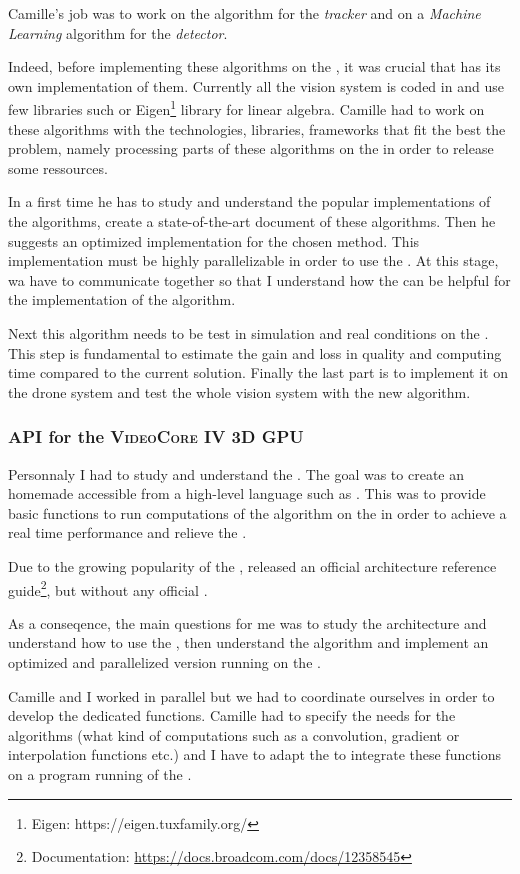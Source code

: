 Camille's job was to work on the  algorithm for the \emph{tracker} and on a \emph{Machine Learning} algorithm for the \emph{detector}.

Indeed, before implementing these algorithms on the \vc, it was crucial that \groupname{} has its own implementation of them. Currently all the vision system is coded in  and use few libraries such  or Eigen\footnote{Eigen: https://eigen.tuxfamily.org/} library for linear algebra. Camille had to work on these algorithms with the technologies, libraries, frameworks that fit the best the problem, namely processing parts of these algorithms on the \vc{} in order to release some  ressources.

In a first time he has to study and understand the popular implementations of the  algorithms, create a state-of-the-art document of these algorithms. Then he suggests an optimized implementation for the chosen method. This implementation must be highly parallelizable in order to use the \vc. At this stage, wa have to communicate together so that I understand how the \vc{} can be helpful for the implementation of the  algorithm.

Next this algorithm needs to be test in simulation and real conditions on the \rasp. This step is fundamental to estimate the gain and loss in quality and computing time compared to the current solution. Finally the last part is to implement it on the drone system and test the whole vision system with the new  algorithm.


\subsubsection{API for the \textsc{VideoCore IV 3D GPU}}

Personnaly I had to study and understand the \vc{}. The goal was to create an homemade  accessible from a high-level language such as . This  was to provide basic functions to run computations of the  algorithm on the \vc{} in order to achieve a real time performance and relieve the .

Due to the growing popularity of the \rasp{},  released an official \vc{} architecture reference guide\footnote{\vc{} Documentation: \url{https://docs.broadcom.com/docs/12358545}}, but without any official .

As a conseqence, the main questions for me was to study the architecture and understand how to use the \vc{}, then understand the  algorithm and implement an optimized and parallelized version running on the \vc{}.

Camille and I worked in parallel but we had to coordinate ourselves in order to develop the dedicated functions. Camille had to specify the needs for the algorithms (what kind of computations such as a convolution, gradient or interpolation functions etc.) and I have to adapt the  to integrate these functions on a program running of the \vc.

